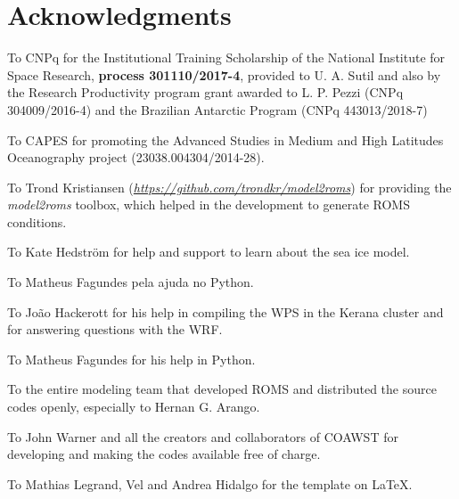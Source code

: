 \chapter*{Acknowledgments}

\bigskip


\noindent To CNPq for the Institutional Training Scholarship of the National Institute for Space Research, \textbf{process 301110/2017-4},
provided to U. A. Sutil and also by the Research Productivity program grant awarded to L. P. Pezzi (CNPq 304009/2016-4) and the 
Brazilian Antarctic Program (CNPq 443013/2018-7)
\bigskip

\noindent To CAPES for promoting the Advanced Studies in Medium and High Latitudes Oceanography project (23038.004304/2014-28). 
\bigskip

\noindent To Trond Kristiansen (\textcolor{bleu_cite}{\textit{\href{https://github.com/trondkr/model2roms}{https://github.com/trondkr/model2roms}}}) for providing the
 \textit{model2roms} toolbox, which helped in the development to generate ROMS conditions.
\bigskip

\noindent To Kate Hedström for help and support to learn about the sea ice model.
\bigskip

\noindent To Matheus Fagundes pela ajuda no Python. 
\bigskip

\noindent To João Hackerott for his help in compiling the WPS in the Kerana cluster and for answering questions with the WRF.
\bigskip

\noindent To Matheus Fagundes for his help in Python.
\bigskip

\noindent To the entire modeling team that developed ROMS and distributed the source codes openly,
especially to Hernan G. Arango.
\bigskip

\noindent To John Warner and all the creators and collaborators of COAWST for developing and making the codes available free of charge.
\bigskip

\noindent To Mathias Legrand, Vel and Andrea Hidalgo for the template on \LaTeX.
\bigskip